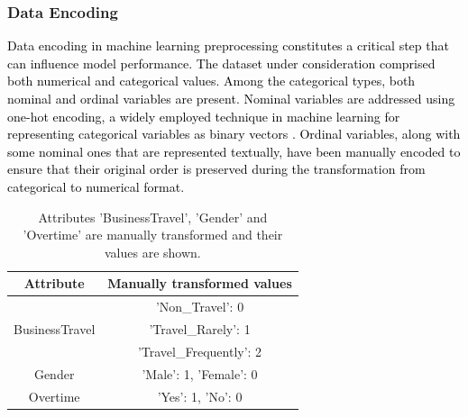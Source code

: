 \documentclass[a4paper,fleqn]{cas-sc}
\begin{document}
\subsubsection{Data Encoding}
\textcolor{black}{Data encoding in machine learning preprocessing constitutes a critical step that can influence model performance. The dataset under consideration comprised both numerical and categorical values. Among the categorical types, both nominal and ordinal variables are present. Nominal variables are addressed using one-hot encoding, a widely employed technique in machine learning for representing categorical variables as binary vectors \cite{Bishop2006}. Ordinal variables, along with some nominal ones that are represented textually, have been manually encoded to ensure that their original order is preserved during the transformation from categorical to numerical format.}

\begin{table}[width=1\linewidth,cols=2,pos=h]
    \centering
    \caption{Attributes 'BusinessTravel', 'Gender' and 'Overtime' are manually transformed and their values are shown.}
    \renewcommand{\arraystretch}{1.5} %
    \label{tab:sample}
    \begin{tabular}{C|C} %
        \hline
        \textbf{Attribute} & \textbf{Manually transformed values} \\ \hline
                           & 'Non\_Travel': 0            \\
         BusinessTravel    & 'Travel\_Rarely': 1         \\
                           & 'Travel\_Frequently': 2     \\ \hline
        Gender             & 'Male': 1, 'Female': 0     \\ \hline
        Overtime           & 'Yes': 1, 'No': 0          \\ \hline
    \end{tabular}
\end{table}
\end{document}
